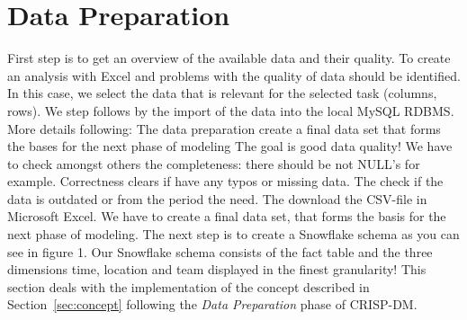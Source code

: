 \documentclass[11pt, journal]{IEEEtran}
\begin{document}
\section{Data Preparation} \label{sec:impl}
First step is to get an overview of the available data and their quality. To create an analysis with Excel and problems with the quality of data should be identified. In this case, we select the data that is relevant for the selected task (columns, rows). We step follows by the import of the data into the local MySQL RDBMS. More details following: The data preparation create a final data set that forms the bases for the next phase of modeling The goal is good data quality! We have to check amongst others the completeness: there should be not NULL’s for example. Correctness clears if have any typos or missing data. The check if the data is outdated or from the period the need. The download the CSV-file in Microsoft Excel. We have to create  a final data set, that forms the basis for the next phase of modeling. The next step is to create a Snowflake schema as you can see in figure 1. Our Snowflake schema consists of the fact table and the three dimensions time, location and team displayed in the finest granularity!  
This section deals with the implementation of the concept described in Section~\ref{sec:concept} following the \emph{Data Preparation}
phase of CRISP-DM. 
\end{document}
